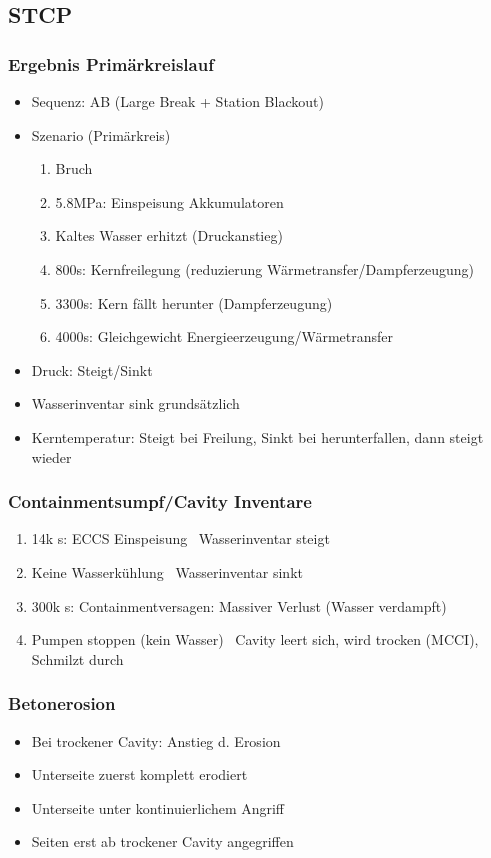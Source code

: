 \documentclass[12pt]{article}
\begin{document}
\subsection{STCP}
\subsubsection{Ergebnis Primärkreislauf}
\begin{itemize}
  \item Sequenz: AB (Large Break + Station Blackout)
  \item Szenario (Primärkreis)
  \begin{enumerate}
    \item Bruch
    \item 5.8MPa: Einspeisung Akkumulatoren
    \item Kaltes Wasser erhitzt (Druckanstieg)
    \item 800s: Kernfreilegung (reduzierung Wärmetransfer/Dampferzeugung)
    \item 3300s: Kern fällt herunter (Dampferzeugung)
    \item 4000s: Gleichgewicht Energieerzeugung/Wärmetransfer
  \end{enumerate}
  \item Druck: Steigt/Sinkt
  \item Wasserinventar sink grundsätzlich
  \item Kerntemperatur: Steigt bei Freilung, Sinkt bei herunterfallen, dann steigt wieder
\end{itemize}

\subsubsection{Containmentsumpf/Cavity Inventare}
\begin{enumerate}
  \item 14k s: ECCS Einspeisung \textrightarrow\ Wasserinventar steigt
  \item Keine Wasserkühlung \textrightarrow\ Wasserinventar sinkt
  \item 300k s: Containmentversagen: Massiver Verlust (Wasser verdampft)
  \item Pumpen stoppen (kein Wasser) \textrightarrow\ Cavity leert sich, wird trocken (MCCI), Schmilzt durch
\end{enumerate}

\subsubsection{Betonerosion}
\begin{itemize}
  \item Bei trockener Cavity: Anstieg d. Erosion
  \item Unterseite zuerst komplett erodiert
  \item Unterseite unter kontinuierlichem Angriff 
  \item Seiten erst ab trockener Cavity angegriffen
\end{itemize}
\end{document}
